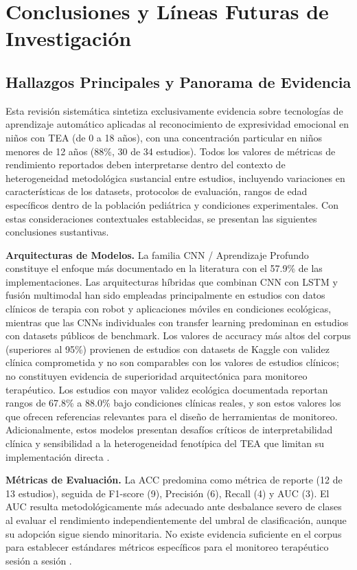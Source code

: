 \documentclass[3p,twocolumn,times]{elsarticle}
\begin{document}
	\section{Conclusiones y Líneas Futuras de Investigación}\label{sec7}
	
	\subsection{Hallazgos Principales y Panorama de Evidencia}\label{sec7a}
	
	Esta revisión sistemática sintetiza exclusivamente evidencia sobre tecnologías de
	aprendizaje automático aplicadas al reconocimiento de expresividad emocional en
	niños con TEA (de 0 a 18 años), con una concentración particular en niños menores
	de 12 años (88\%, 30 de 34 estudios). Todos los valores de métricas de rendimiento
	reportados deben interpretarse dentro del contexto de heterogeneidad metodológica
	sustancial entre estudios, incluyendo variaciones en características de los
	datasets, protocolos de evaluación, rangos de edad específicos dentro de la
	población pediátrica y condiciones experimentales. Con estas consideraciones
	contextuales establecidas, se presentan las siguientes conclusiones sustantivas.
	
	\textbf{Arquitecturas de Modelos.} La familia CNN / Aprendizaje Profundo constituye
	el enfoque más documentado en la literatura con el 57.9\% de las implementaciones.
	Las arquitecturas híbridas que combinan CNN con LSTM y fusión multimodal han sido
	empleadas principalmente en estudios con datos clínicos de terapia con robot y
	aplicaciones móviles en condiciones ecológicas, mientras que las CNNs individuales
	con transfer learning predominan en estudios con datasets públicos de benchmark.
	Los valores de accuracy más altos del corpus (superiores al 95\%) provienen de
	estudios con datasets de Kaggle con validez clínica comprometida y no son
	comparables con los valores de estudios clínicos; no constituyen evidencia de
	superioridad arquitectónica para monitoreo terapéutico. Los estudios con mayor
	validez ecológica documentada reportan rangos de 67.8\% a 88.0\% bajo condiciones
	clínicas reales, y son estos valores los que ofrecen referencias relevantes para
	el diseño de herramientas de monitoreo. Adicionalmente, estos modelos presentan
	desafíos críticos de interpretabilidad clínica y sensibilidad a la heterogeneidad
	fenotípica del TEA que limitan su implementación directa \cite{Hassan2025,Rudovic2019}.
	
	\textbf{Métricas de Evaluación.} La ACC predomina como métrica de reporte (12 de
	13 estudios), seguida de F1-score (9), Precisión (6), Recall (4) y AUC (3). El AUC
	resulta metodológicamente más adecuado ante desbalance severo de clases al evaluar
	el rendimiento independientemente del umbral de clasificación, aunque su adopción
	sigue siendo minoritaria. No existe evidencia suficiente en el corpus para
	establecer estándares métricos específicos para el monitoreo terapéutico sesión a
	sesión \cite{Radocaj2025}.
	
\end{document}
